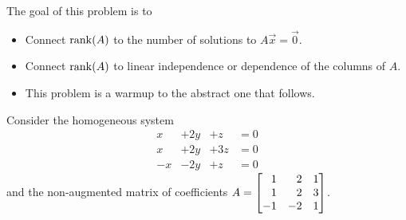 \documentclass{problemset}
\newcommand{\bookonlynewpage}{\begin{bookonly}\newpage\end{bookonly}}
\begin{document}
	\bookonlynewpage
	\question
	\begin{annotation}
		\begin{goals}

			The goal of this problem is to
			\begin{itemize}
				\item Connect $\operatorname{rank}(A)$ to the number of solutions to $A\vec x=\vec 0$.
				\item Connect $\operatorname{rank}(A)$ to linear independence or dependence of the columns of $A$.
			\end{itemize}
		\end{goals}

		\begin{notes}
			\begin{itemize}
				\item This problem is a warmup to the abstract one that follows.
			\end{itemize}
		\end{notes}
	\end{annotation}
	Consider the homogeneous system
		\begin{equation}\label{eq4bx}
			\begin{array}{llll}
				x&+2y&+z &= 0\\
				x&+2y&+3z &= 0\\
				-x&-2y&+z &= 0
			\end{array}
		\end{equation}
	and the non-augmented matrix of coefficients $A=\mat{1&2&1\\1&2&3\\-1&-2&1}$.
\end{document}
